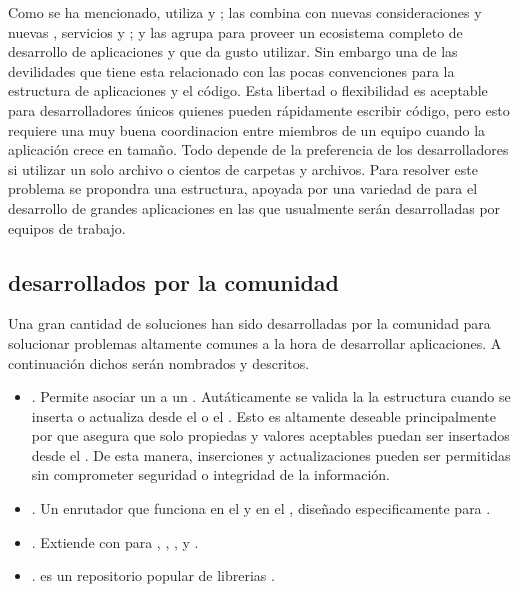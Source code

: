 Como se ha mencionado, \meteorNAME utiliza \librariesPC y \toolsCPT; las combina con nuevas consideraciones y nuevas \librariesPC, servicios y \standards; y las agrupa para proveer un ecosistema completo de desarrollo de aplicaciones \webINT y \mobileINT que da gusto utilizar. Sin embargo una de las devilidades que tiene 	\meteorNAME esta relacionado con las pocas convenciones para la estructura de aplicaciones y el código. Esta libertad o flexibilidad es aceptable para desarrolladores únicos quienes pueden rápidamente escribir código, pero esto requiere una muy buena coordinacion entre miembros de un equipo cuando la aplicación crece en tamaño. Todo depende de la preferencia de los desarrolladores si utilizar un solo archivo o cientos de carpetas y archivos. Para resolver este problema se propondra una estructura, apoyada por una variedad de \packagesAS para el desarrollo de grandes aplicaciones en las que usualmente serán desarrolladas por equipos de trabajo.

\subsection{\packagesAS desarrollados por la comunidad}
Una gran cantidad de soluciones han sido desarrolladas por la comunidad para solucionar problemas altamente comunes a la hora de desarrollar aplicaciones. A continuación dichos \packagesAS serán nombrados y descritos.

	\begin{itemize}
		\item
			\textbf{\nameCollectionTwo}. Permite asociar un \schemaDB a un \mongoCollection. Autáticamente se valida la la estructura cuando se inserta o actualiza desde el \clientAS o el \serverAS. Esto es altamente deseable principalmente por que asegura que solo propiedas y valores aceptables puedan ser insertados desde el \clientAS. De esta manera, inserciones y actualizaciones \clientSideAS pueden ser permitidas sin comprometer seguridad o integridad de la información.
		\item
			\textbf{\nameRouter}. Un enrutador que funciona en el \serverAS y en el \browserINT, diseñado especificamente para \meteorNAME.
		\item
			\textbf{\nameCollectionHooks}. Extiende \mongoCollection con \hooksCPT \beforeAfterDB para \insertDB, \updateDB, \removeDB, \findDB y \findOneDB.
		\item
			\textbf{\nameBower}. \bowerIONAME es un repositorio popular de librerias \javaScriptNAME \clientSideAS.
	\end{itemize}


